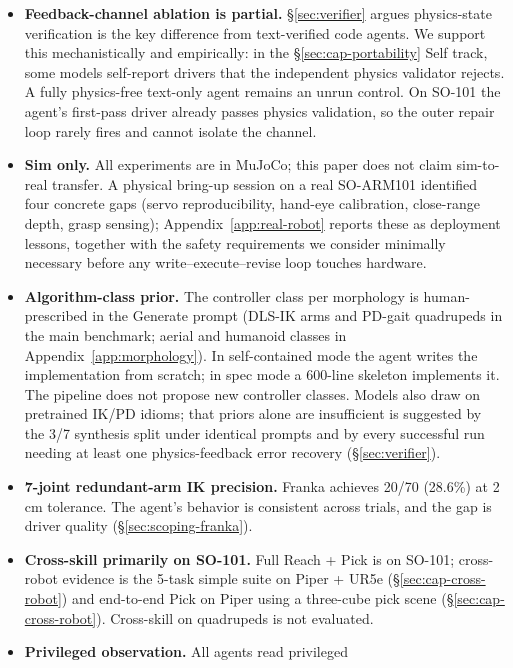 \begin{itemize}
\item \textbf{Feedback-channel ablation is partial.}
  \S\ref{sec:verifier} argues physics-state verification is the key
  difference from text-verified code agents. We support this
  mechanistically and empirically: in the \S\ref{sec:cap-portability}
  Self track, some models self-report drivers that the independent
  physics validator rejects. A fully physics-free text-only agent
  remains an unrun control. On SO-101 the agent's first-pass driver
  already passes physics validation, so the outer repair loop rarely
  fires and cannot isolate the channel.
\item \textbf{Sim only.} All experiments are in MuJoCo; this
  paper does not claim sim-to-real transfer. A physical bring-up
  session on a real SO-ARM101 identified four concrete gaps
  (servo reproducibility, hand-eye calibration, close-range
  depth, grasp sensing); Appendix~\ref{app:real-robot} reports
  these as deployment lessons, together with the safety
  requirements we consider minimally necessary before any
  write--execute--revise loop touches hardware.
\item \textbf{Algorithm-class prior.} The controller class per
  morphology is human-prescribed in the Generate prompt (DLS-IK
  arms and PD-gait quadrupeds in the main benchmark; aerial and
  humanoid classes in Appendix~\ref{app:morphology}). In
  self-contained mode the agent writes the implementation from
  scratch; in spec mode a 600-line skeleton implements it. The
  pipeline does not propose new controller classes. Models also
  draw on pretrained IK/PD idioms; that priors alone are
  insufficient is suggested by the 3/7 synthesis split under
  identical prompts and by every successful run needing at least
  one physics-feedback error recovery (\S\ref{sec:verifier}).
\item \textbf{7-joint redundant-arm IK precision.} Franka
  achieves 20/70 (28.6\%) at 2\,cm tolerance. The agent's
  behavior is consistent across trials, and the gap is driver
  quality (\S\ref{sec:scoping-franka}).
\item \textbf{Cross-skill primarily on SO-101.} Full Reach + Pick
  is on SO-101; cross-robot evidence is the 5-task simple suite
  on Piper + UR5e (\S\ref{sec:cap-cross-robot}) and end-to-end
  Pick on Piper using a three-cube pick scene
  (\S\ref{sec:cap-cross-robot}). Cross-skill on quadrupeds is
  not evaluated.
\item \textbf{Privileged observation.} All agents read privileged

\end{itemize}
